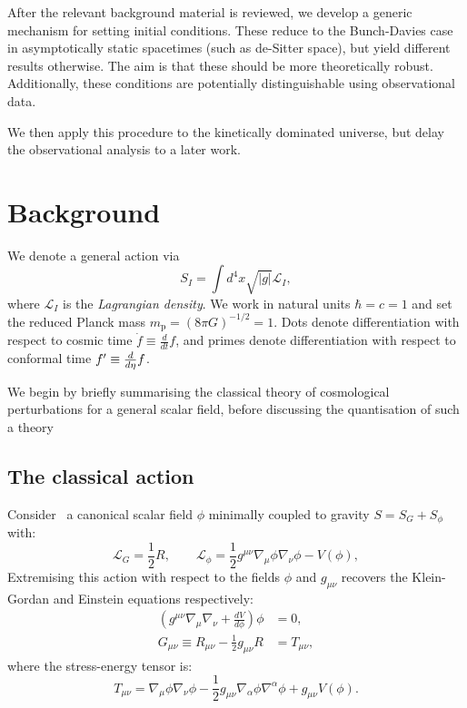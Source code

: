 After the relevant background material is reviewed, we develop a generic mechanism for setting initial conditions. These reduce to the Bunch-Davies case in asymptotically static spacetimes (such as de-Sitter space), but yield different results otherwise. The aim is that these should be more theoretically robust. Additionally, these conditions are potentially distinguishable using observational data.

We then apply this procedure to the kinetically dominated universe, but delay the observational analysis to a later work.

\section{Background}
\label{sec:background}

We denote a general action via
\begin{equation}
  S_I = \int d^4x\sqrt{|g|}\mathcal{L}_I,
  \label{eqn:general_action}
\end{equation}
where $\mathcal{L}_I$ is the {\em Lagrangian density}. We work in natural units $\hbar=c=1$ and set the reduced Planck mass $m_\mathrm{p} = {(8\pi G)}^{-1/2} = 1$. Dots denote differentiation with respect to cosmic time $\dot{f}\equiv \frac{d}{dt}f$, and primes denote differentiation with respect to conformal time ${{f}^\prime}\equiv\frac{d}{d\eta}f$.

We begin by briefly summarising the classical theory of cosmological perturbations for a general scalar field, before discussing the quantisation of such a theory


\subsection{The classical action}
\label{sec:inflation}
Consider~\cite{Baumann+2009} a canonical scalar field $\phi$ minimally coupled to gravity $S= S_G + S_\phi$ with:
\begin{equation}
  \mathcal{L}_G = \frac{1}{2}R, 
  \qquad
  \mathcal{L}_\phi = \frac{1}{2}g^{\mu\nu}\nabla_\mu\phi\nabla_\nu\phi - V(\phi),
  \label{eqn:action}
\end{equation}
Extremising this action with respect to the fields $\phi$ and $g_{\mu\nu}$ recovers the Klein-Gordan and Einstein equations respectively:
\begin{align}
  \left( g^{\mu\nu}\nabla_\mu\nabla_\nu + \frac{dV}{d\phi} \right) \phi &= 0,
  \label{eqn:klein_gordon}\\
  G_{\mu\nu}\equiv R_{\mu\nu}-\frac{1}{2}g_{\mu\nu}R&= T_{\mu\nu},
  \label{eqn:einstein}
\end{align}
where the stress-energy tensor is:
\begin{equation}
  T_{\mu\nu} = \nabla_\mu\phi \nabla_\nu\phi - \frac{1}{2}g_{\mu\nu} \nabla_\alpha\phi \nabla^\alpha\phi +g_{\mu\nu} V(\phi).
  \label{eqn:SET}
\end{equation}

